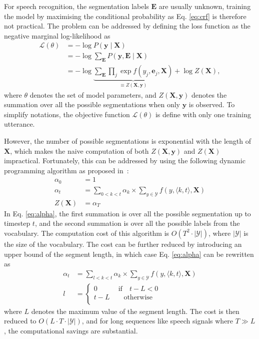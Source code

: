 \documentclass[a4paper]{article}
\begin{document}
For speech recognition, the segmentation labels $\mathbf{E}$ are usually unknown,  training the model by maximising the conditional probability as Eq. \eqref{eq:crf} is therefore not practical. The problem can be addressed by defining the loss function as the negative marginal log-likelihood as
\begin{align}
\mathcal{L}(\theta) &= - \log P(\mathbf{y} \mid \mathbf{X}) \nonumber \\
 &= - \log \sum_{\mathbf{E}} P(\mathbf{y, E} \mid \mathbf{X}) \nonumber \\
&= - \log \underbrace{\sum_{\mathbf{E}} \prod_j \exp f \left( y_j, \mathbf{e}_j, \mathbf{X} \right)}_{\equiv Z(\mathbf{X}, \mathbf{y})} + \log Z(\mathbf{X}),
\end{align}
where $\theta$ denotes the set of model parameters, and $Z(\mathbf{X}, \mathbf{y})$ denotes the summation over all the possible segmentations when only $\mathbf{y}$ is observed. To simplify notations, the objective function $\mathcal{L}(\theta)$ is define with only one training utterance. 

However, the number of possible segmentations is exponential with the length of $\mathbf{X}$, which makes the naive computation of both $Z(\mathbf{X}, \mathbf{y})$ and $Z(\mathbf{X})$ impractical. Fortunately, this can be addressed by using the following dynamic programming algorithm as proposed in~\cite{sarawagi2004semi}:
\begin{align}
\alpha_0 &= 1 \\
\label{eq:alpha}
\alpha_{t} & = \sum_{0<k<t} \alpha_{k} \times \sum_{y\in \mathcal{Y}} f(y, \langle k, t \rangle, \mathbf{X}) \\
Z(\mathbf{X}) & = \alpha_T
\end{align}
In Eq. \eqref{eq:alpha}, the first summation is over all the possible segmentation up to timestep $t$, and the second summation is over all the possible labels from the vocabulary. The computation cost of this algorithm is $O(T^2\cdot |\mathcal{Y}|)$, where $|\mathcal{Y}|$ is the size of the vocabulary. The cost can be further reduced by introducing an upper bound of  the segment length, in which case Eq. \eqref{eq:alpha} can be rewritten as
\begin{align}
\label{eq:alpha2}
\alpha_{t} & = \sum_{l<k<t} \alpha_{k} \times \sum_{y\in \mathcal{Y}} f(y, \langle k, t \rangle, \mathbf{X}) \\
\label{eq:seglen}
l & = \left \{ \begin{array}{l}
0 \qquad \quad \text{if} \quad t - L < 0 \\
t - L \qquad \text{otherwise} \\
\end{array}
\right .
\end{align}
where $L$ denotes the maximum value of the segment length. The cost is then reduced to $O(L\cdot T\cdot |\mathcal{Y}|)$, and for long sequences like speech signals where $T \gg L$, the computational savings are substantial. 
\end{document}
